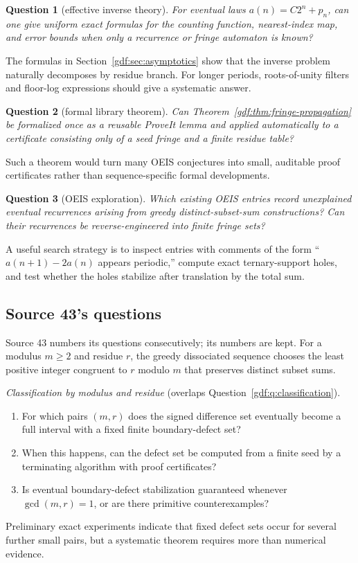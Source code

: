 \documentclass[11pt,a4paper]{article}
\numberwithin{equation}{section}
\theoremstyle{definition}
\theoremstyle{remark}
\theoremstyle{plain}
\newtheorem{question}{Question}
\begin{document}
\begin{question}[effective inverse theory]\label{gdf:q:inverse}
For eventual laws $a(n)=C2^n+p_n$, can one give uniform exact formulas for the
counting function, nearest-index map, and error bounds when only a recurrence
or fringe automaton is known?
\end{question}

The formulas in Section~\ref{gdf:sec:asymptotics} show that the inverse problem
naturally decomposes
by residue branch.  For longer periods, roots-of-unity filters and floor-log
expressions should give a systematic answer.

\begin{question}[formal library theorem]\label{gdf:q:formal}
Can Theorem~\ref{gdf:thm:fringe-propagation} be formalized once as a reusable
ProveIt lemma and applied automatically to a certificate consisting only of a
seed fringe and a finite residue table?
\end{question}

Such a theorem would turn many OEIS conjectures into small, auditable proof
certificates rather than sequence-specific formal developments.

\begin{question}[OEIS exploration]\label{gdf:q:oeis}
Which existing OEIS entries record unexplained eventual recurrences arising
from greedy distinct-subset-sum constructions?  Can their recurrences be
reverse-engineered into finite fringe sets?
\end{question}

A useful search strategy is to inspect entries with comments of the form
``$a(n+1)-2a(n)$ appears periodic,'' compute exact ternary-support holes, and
test whether the holes stabilize after translation by the total sum.

\subsection{Source 43's questions}\label{gdf:sec:questions43}

Source 43 numbers its questions consecutively; its numbers are kept.  For a
modulus $m\ge2$ and residue $r$, the greedy dissociated sequence chooses the
least positive integer congruent to $r$ modulo $m$ that preserves distinct
subset sums.

\emph{Classification by modulus and residue} (overlaps
Question~\ref{gdf:q:classification}).
\begin{enumerate}[label=43.\arabic*]
\item For which pairs $(m,r)$ does the signed difference set eventually become
      a full interval with a fixed finite boundary-defect set?
\item When this happens, can the defect set be computed from a finite seed by
      a terminating algorithm with proof certificates?
\item Is eventual boundary-defect stabilization guaranteed whenever
      $\gcd(m,r)=1$, or are there primitive counterexamples?
\end{enumerate}
Preliminary exact experiments indicate that fixed defect sets occur for
several further small pairs, but a systematic theorem requires more than
numerical evidence.
\end{document}
